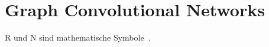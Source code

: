 \chapter{Graph Convolutional Networks}

\gls{R} und \gls{N} sind mathematische Symbole~\cite{nielsen15}.
